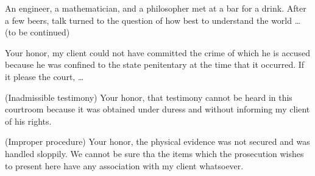 \begin{joke}
\hypertarget{}{An engineer, a mathematician, and a philosopher met
at a bar for a drink.  After a few beers, talk
turned to the question of how best to understand
the world …​ (to be continued)}
\end{joke}

\begin{objection}
\hypertarget{}{Your honor, my client could not have committed the
crime of which he is accused because he was
confined to the state penitentary at the time
that it occurred.  If it please the court, …​}
\end{objection}
\begin{objection}
{\rm (Inadmissible testimony) }\hypertarget{}{Your honor, that testimony cannot be
heard in this courtroom because it
was obtained under duress and without
informing my client of his rights.}
\end{objection}
\begin{objection}
{\rm (Improper procedure) }\hypertarget{}{Your honor, the physical evidence
was not secured and was handled sloppily.
We cannot be sure tha the items which
the prosecution wishes to present here
have any association with my client
whatsoever.}
\end{objection}
